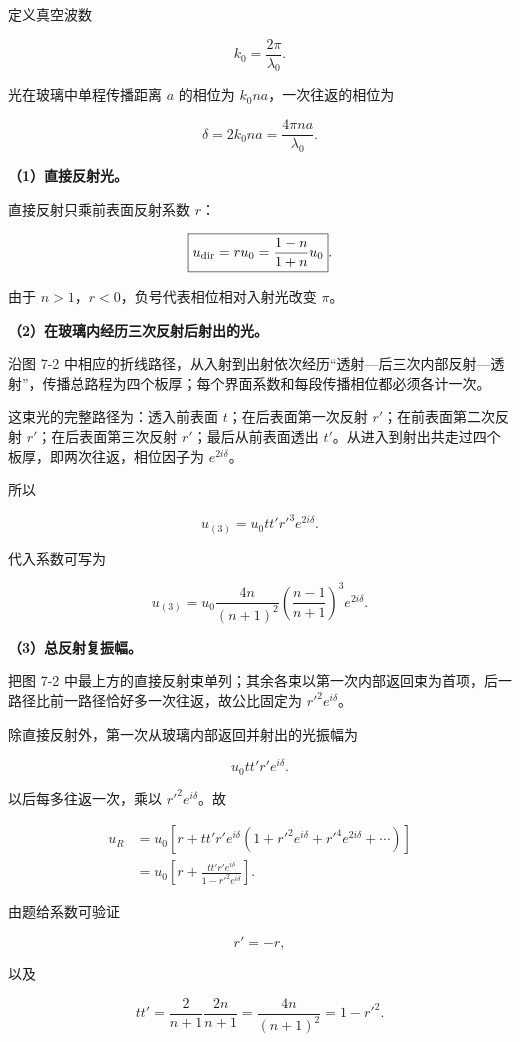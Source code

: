 \documentclass[12pt,a4paper,UTF8]{ctexart}
\begin{document}
定义真空波数

\[k_0=\frac{2\pi}{\lambda_0}.\]

光在玻璃中单程传播距离 \(a\) 的相位为 \(k_0na\)，一次往返的相位为

\[\boxed{\delta=2k_0na=\frac{4\pi na}{\lambda_0}}.\]

\textbf{（1）直接反射光。}

直接反射只乘前表面反射系数 \(r\)：

\[
\boxed{u_{\rm dir}=ru_0=\frac{1-n}{1+n}u_0}.
\]

由于 \(n>1\)，\(r<0\)，负号代表相位相对入射光改变 \(\pi\)。

\textbf{（2）在玻璃内经历三次反射后射出的光。}

沿图 7-2
中相应的折线路径，从入射到出射依次经历``透射---后三次内部反射---透射''，传播总路程为四个板厚；每个界面系数和每段传播相位都必须各计一次。

这束光的完整路径为：透入前表面 \(t\)；在后表面第一次反射
\(r'\)；在前表面第二次反射 \(r'\)；在后表面第三次反射
\(r'\)；最后从前表面透出
\(t'\)。从进入到射出共走过四个板厚，即两次往返，相位因子为
\(e^{2i\delta}\)。

所以

\[
\boxed{u_{(3)}=u_0tt'r'^3e^{2i\delta}}.
\]

代入系数可写为

\[
\boxed{
u_{(3)}=u_0\frac{4n}{(n+1)^2}
\left(\frac{n-1}{n+1}\right)^3e^{2i\delta}}.
\]

\textbf{（3）总反射复振幅。}

把图 7-2
中最上方的直接反射束单列；其余各束以第一次内部返回束为首项，后一路径比前一路径恰好多一次往返，故公比固定为
\(r'^2e^{i\delta}\)。

除直接反射外，第一次从玻璃内部返回并射出的光振幅为

\[u_0tt'r'e^{i\delta}.\]

以后每多往返一次，乘以 \(r'^2e^{i\delta}\)。故

\[
\begin{aligned}
u_R
&=u_0\left[r+tt'r'e^{i\delta}
\left(1+r'^2e^{i\delta}+r'^4e^{2i\delta}+\cdots\right)\right]\\
&=u_0\left[r+\frac{tt'r'e^{i\delta}}
{1-r'^2e^{i\delta}}\right].
\end{aligned}
\]

由题给系数可验证

\[r'=-r,\]

以及

\[
tt'=\frac{2}{n+1}\frac{2n}{n+1}
=\frac{4n}{(n+1)^2}
=1-r'^2.
\]
\end{document}
